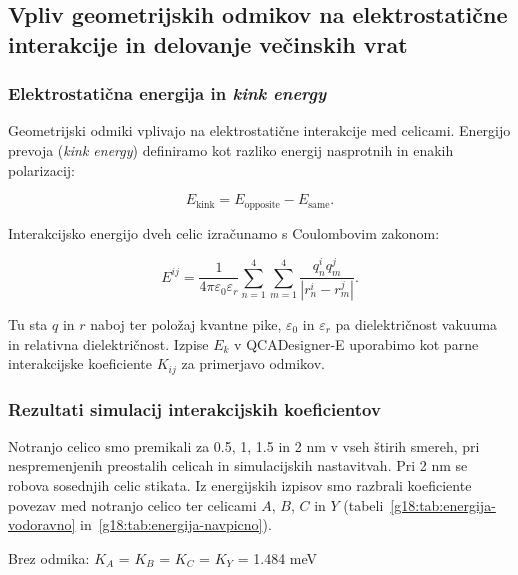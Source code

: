 \documentclass[12pt,a4paper]{article}
\begin{document}
\subsection{Vpliv geometrijskih odmikov na elektrostatične interakcije in delovanje večinskih vrat}
\label{g18:sec:rez-energija}

\subsubsection{Elektrostatična energija in \emph{kink energy}}
\label{g18:sec:elektrostaticna-energija}

Geometrijski odmiki vplivajo na elektrostatične interakcije med celicami. Energijo prevoja (\emph{kink energy}) definiramo kot razliko energij nasprotnih in enakih polarizacij:

\begin{equation}
    E_{\mathrm{kink}} =
    E_{\mathrm{opposite}} - E_{\mathrm{same}}.
\end{equation}

Interakcijsko energijo dveh celic izračunamo s Coulombovim zakonom:

\begin{equation}
    E_{}^{ij} =
    \frac{1}{4\pi\varepsilon_0\varepsilon_r}
    \sum_{n=1}^{4}\sum_{m=1}^{4}
    \frac{q_{n}^{i}q_{m}^{j}}{|r_{n}^{i}-r_{m}^{j}|}.
\end{equation}

Tu sta $q$ in $r$ naboj ter položaj kvantne pike, $\varepsilon_0$ in $\varepsilon_r$ pa dielektričnost vakuuma in relativna dielektričnost. Izpise $E_k$ v QCADesigner-E uporabimo kot parne interakcijske koeficiente $K_{ij}$ za primerjavo odmikov.

\subsubsection{Rezultati simulacij interakcijskih koeficientov}
\label{g18:sec:interakcijski-koeficienti}

Notranjo celico smo premikali za 0.5, 1, 1.5 in 2 nm v vseh štirih smereh, pri nespremenjenih preostalih celicah in simulacijskih nastavitvah. Pri 2 nm se robova sosednjih celic stikata. Iz energijskih izpisov smo razbrali koeficiente povezav med notranjo celico ter celicami $A$, $B$, $C$ in $Y$ (tabeli~\ref{g18:tab:energija-vodoravno} in~\ref{g18:tab:energija-navpicno}).

\noindent Brez odmika: $K_A$ = $K_B$ = $K_C$ = $K_Y$ = 1.484 meV
\end{document}
